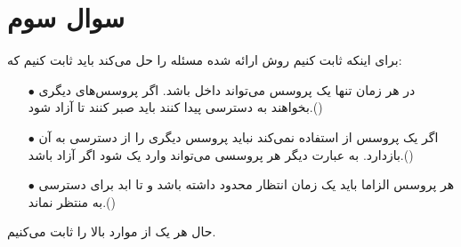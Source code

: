 \documentclass{article}
\begin{document}
\section{سوال سوم}
برای اینکه ثابت کنیم روش ارائه شده مسئله  را حل می‌کند باید ثابت کنیم که:
\begin{itemize}
    \item [$\bullet$] در هر زمان تنها یک پروسس می‌تواند داخل  باشد. اگر پروسس‌های دیگری بخواهند به  دسترسی پیدا کنند باید صبر کنند تا آزاد شود.()

    \item [$\bullet$] اگر یک پروسس از  استفاده نمی‌کند نباید پروسس دیگری را از دسترسی به آن بازدارد. به عبارت دیگر هر پروسسی می‌تواند وارد یک  شود اگر آزاد باشد.()

    \item [$\bullet$] هر پروسس الزاما باید یک زمان انتظار محدود داشته باشد و تا ابد برای دسترسی به  منتظر نماند.()
\end{itemize}
حال هر یک از موارد بالا را ثابت می‌کنیم.
\newpage
\end{document}
